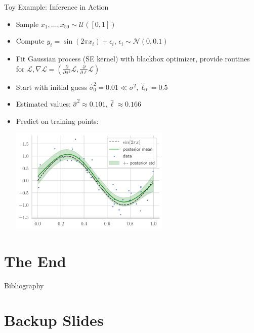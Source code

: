 \documentclass{beamer}
\begin{document}
\begin{frame}{Toy Example: Inference in Action}
\begin{itemize}[<+->]
    \item Sample $ x_1, \ldots, x_{50} \sim \mathcal U([0,1])$
    \item Compute $y_i = \sin(2\pi x_i) + \epsilon_i$, $\epsilon_i \sim \mathcal N(0, 0.1)$
    \item Fit Gaussian process (SE kernel) with blackbox optimizer, provide routines for $\mathcal L, \nabla \mathcal L = (\frac{\partial}{\partial \sigma^2} \mathcal L, \frac{\partial}{\partial \ell} \mathcal L)$
    \item Start with initial guess $\hat \sigma^2_0 = 0.01 \ll \sigma^2, \hat \ell_0 = 0.5$
    \item Estimated values: $\hat\sigma^2 \approx 0.101, \hat \ell \approx 0.166$
    \item Predict on training points:
    \begin{center}
    \includegraphics[width=0.6\textwidth]{report/res/toy_example.pdf}
    \end{center}
\end{itemize}
\end{frame}

\section{The End}

\begin{frame}[allowframebreaks]{Bibliography}

\printbibliography
\end{frame}

\section{Backup Slides}
\end{document}
